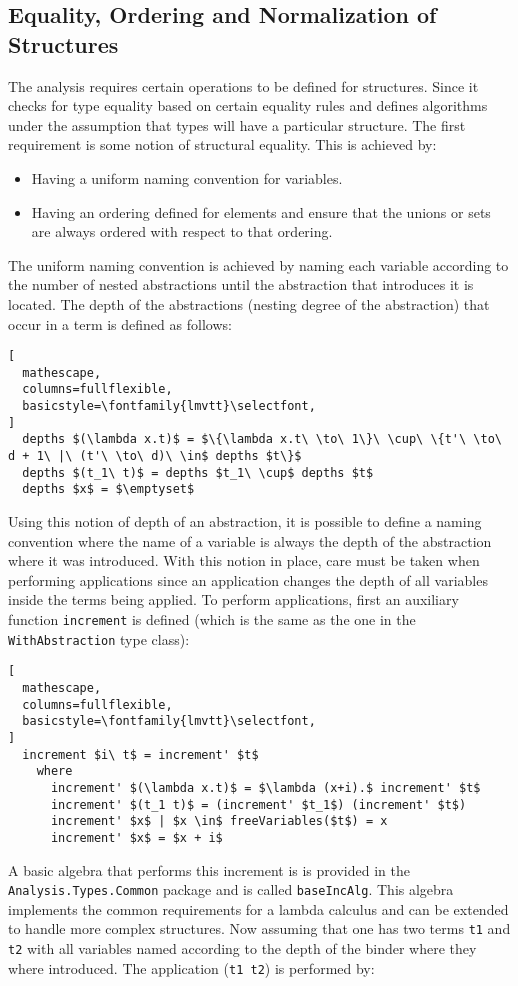 \documentclass[8pt]{extarticle}
\begin{document}
\subsection{Equality, Ordering and Normalization of Structures}
\label{sec:red}
The analysis requires certain operations to be defined for structures. Since it checks for type equality based on certain equality rules and defines algorithms under the assumption that types will have a particular structure. The first requirement is some notion of structural equality. This is achieved by:
\begin{itemize}
\item Having a uniform naming convention for variables.
\item Having an ordering defined for elements and ensure that the unions or sets are always ordered with respect to that ordering.
\end{itemize}
The uniform naming convention is achieved by naming each variable according to the number of nested abstractions until the abstraction that introduces it is located. The depth of the abstractions (nesting degree of the abstraction) that occur in a term is defined as follows:
\begin{lstlisting}[
  mathescape,
  columns=fullflexible,
  basicstyle=\fontfamily{lmvtt}\selectfont,
]
  depths $(\lambda x.t)$ = $\{\lambda x.t\ \to\ 1\}\ \cup\ \{t'\ \to\ d + 1\ |\ (t'\ \to\ d)\ \in$ depths $t\}$
  depths $(t_1\ t)$ = depths $t_1\ \cup$ depths $t$
  depths $x$ = $\emptyset$
\end{lstlisting}
Using this notion of depth of an abstraction, it is possible to define a naming convention where the name of a variable is always the depth of the abstraction where it was introduced. With this notion in place, care must be taken when performing applications since an application changes the depth of all variables inside the terms being applied. To perform applications, first an auxiliary function \verb+increment+ is defined (which is the same as the one in the \verb+WithAbstraction+ type class):
\begin{lstlisting}[
  mathescape,
  columns=fullflexible,
  basicstyle=\fontfamily{lmvtt}\selectfont,
]
  increment $i\ t$ = increment' $t$
    where
      increment' $(\lambda x.t)$ = $\lambda (x+i).$ increment' $t$
      increment' $(t_1 t)$ = (increment' $t_1$) (increment' $t$)
      increment' $x$ | $x \in$ freeVariables($t$) = x
      increment' $x$ = $x + i$
\end{lstlisting}
A basic algebra that performs this increment is is provided in the \verb+Analysis.Types.Common+ package and is called \verb+baseIncAlg+. This algebra implements the common requirements for a lambda calculus and can be extended to handle more complex structures. Now assuming that one has two terms \verb+t1+ and \verb+t2+ with all variables named according to the depth of the binder where they where introduced. The application (\verb+t1 t2+) is performed by:
\end{document}
